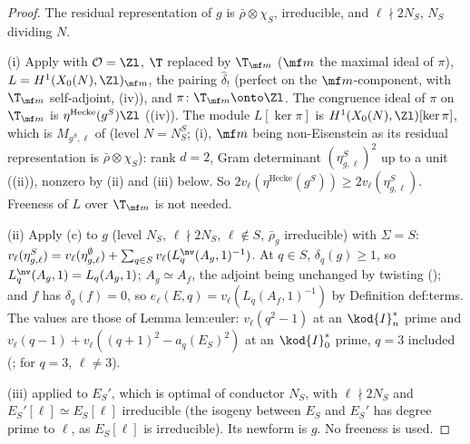 \begin{proof}
The residual representation of $g$ is $\bar\rho\otimes\chi_S$, irreducible, and $\ell\nmid2N_S$, $N_S$ dividing $N$.

(i) Apply  with $\mathcal O=\Zl$, $\T$ replaced by $\T_{\mf m}$ ($\mf m$ the maximal ideal of $\pi$), $L=H^1(X_0(N),\Zl)_{\mf m}$, the pairing $\hat\delta_!$ (perfect on the $\mf m$-component, with
$\T_{\mf m}$ self-adjoint, (iv)), and $\pi\colon\T_{\mf m}\onto\Zl$. The congruence ideal of $\pi$ on $\T_{\mf m}$ is $\eta^{\mathrm{Hecke}}(g^S)\Zl$ ((iv)).
The module $L[\ker\pi]$ is $H^1(X_0(N),\Zl)[\ker\pi]$, which is $M_{g^S,\ell}$ of  (level $N=N_S^S$; (i), $\mf m$ being non-Eisenstein as its residual
representation is $\bar\rho\otimes\chi_S$): rank $d=2$, Gram determinant $(\eta^S_{g,\ell})^2$ up to a unit ((ii)), nonzero by (ii) and (iii) below. So
$2v_\ell(\eta^{\mathrm{Hecke}}(g^S))\ge2v_\ell(\eta^S_{g,\ell})$. Freeness of $L$ over $\T_{\mf m}$ is not needed.

(ii) Apply (c) to $g$ (level $N_S$, $\ell\nmid2N_S$, $\ell\notin S$, $\bar\rho_g$ irreducible) with $\Sigma=S$:
$v_\ell(\eta^S_{g,\ell})=v_\ell(\eta^\emptyset_{g,\ell})+\sum_{q\in S}v_\ell(L^{\nv}_q(A_g,1)^{-1})$. At $q\in S$, $\delta_q(g)\ge1$, so $L^{\nv}_q(A_g,1)=L_q(A_g,1)$; $A_g\simeq A_f$, the adjoint being unchanged by twisting
(); and $f$ has $\delta_q(f)=0$, so $e_\ell(E,q)=v_\ell(L_q(A_f,1)^{-1})$ by Definition def:terms. The values are those of Lemma lem:euler: $v_\ell(q^2-1)$ at an $\kod{I}_n^*$ prime and
$v_\ell(q-1)+v_\ell((q+1)^2-a_q(E_S)^2)$ at an $\kod{I}_0^*$ prime, $q=3$ included (; for $q=3$, $\ell\ne3$).

(iii)  applied to $E_S'$, which is optimal of conductor $N_S$, with $\ell\nmid2N_S$ and $E_S'[\ell]\simeq E_S[\ell]$ irreducible (the isogeny between $E_S$ and $E_S'$ has degree prime to $\ell$,
as $E_S[\ell]$ is irreducible). Its newform is $g$. No freeness is used.
\end{proof}


